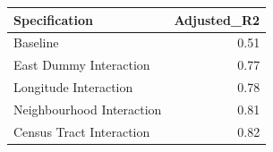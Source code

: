 \begin{tabular}{lr}
  \hline
Specification & Adjusted\_R2 \\ 
  \hline
Baseline & 0.51 \\ 
  East Dummy Interaction & 0.77 \\ 
  Longitude Interaction & 0.78 \\ 
  Neighbourhood Interaction & 0.81 \\ 
  Census Tract Interaction & 0.82 \\ 
   \hline
\end{tabular}
